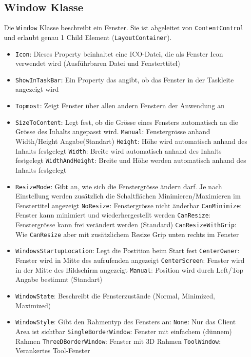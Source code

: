 \subsection{Window Klasse}
Die \verb+Window+ Klasse beschreibt ein Fenster. Sie ist abgeleitet von \verb+ContentControl+ und erlaubt genau 1 Child Element (\verb+LayoutContainer+).
\begin{itemize}
\item \verb+Icon+: Dieses Property beinhaltet eine ICO-Datei, die als Fenster Icon verwendet wird (Ausführbaren Datei und Fensterttitel)
\item \verb+ShowInTaskBar+: Ein Property das angibt, ob das Fenster in der Taskleite angezeigt wird
\item \verb+Topmost+: Zeigt Fenster über allen andern Fenstern der Anwendung an
\item \verb+SizeToContent+: Legt fest, ob die Grösse eines Fensters automatisch an die Grösse des Inhalts angepasst wird.
    \subitem \verb+Manual+: Fenstergrösse anhand Width/Height Angabe(Standart)
    \subitem \verb+Height+: Höhe wird automatisch anhand des Inhalts festgelegt
    \subitem \verb+Width+: Breite wird automatisch anhand des Inhalts festgelegt
    \subitem \verb+WidthAndHeight+: Breite und Höhe werden automatisch anhand des Inhalts festgelegt
\item \verb+ResizeMode+: Gibt an, wie sich die Fenstergrösse ändern darf. Je nach Einstellung werden zusätzlich die Schaltflächen Minimieren/Maximieren im Fenstertitel angezeigt
    \subitem \verb+NoResize+: Fenstergrösse nicht änderbar
    \subitem \verb+CanMinimize+: Fenster kann minimiert und wiederhergestellt werden
    \subitem \verb+CanResize+: Fenstergrösse kann frei verändert werden (Standard)
    \subitem \verb+CanResizeWithGrip+: Wie \verb+CanResize+ aber mit zusätzlichem Resize Grip unten rechts im Fenster
\item \verb+WindowsStartupLocation+: Legt die Postition beim Start fest
    \subitem \verb+CenterOwner+: Fenster wird in Mitte des aufrufenden angezeigt
    \subitem \verb+CenterScreen+: Fenster wird in der Mitte des Bildschirm angezeigt
    \subitem \verb+Manual+: Position wird durch Left/Top Angabe bestimmt (Standart)
\item \verb+WindowState+: Beschreibt die Fensterzustände (Normal, Minimized, Maximized)
\item \verb+WindowStyle+: Gibt den Rahmentyp des Fensters an:
    \subitem \verb+None+: Nur das Client Area ist sichtbar
    \subitem \verb+SingleBorderWindow+: Fenster mit einfachem (dünnem) Rahmen
    \subitem \verb+ThreeDBorderWindow+: Fenster mit 3D Rahmen
    \subitem \verb+ToolWindow+: Verankertes Tool-Fenster
\end{itemize}
